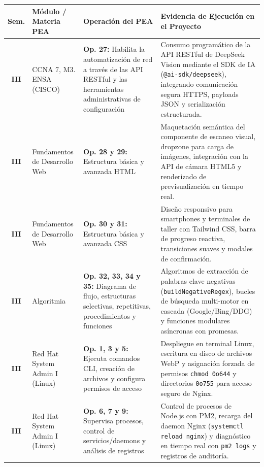\documentclass[11pt,a4paper]{article}
\begin{document}
\begin{table}[htbp]
\centering
\small
\begin{tabularx}{\textwidth}{c p{3.8cm} p{4.2cm} X}
\toprule
\rowcolor{tableheader}
\color{white}\textbf{Sem.} & \color{white}\textbf{Módulo / Materia PEA} & \color{white}\textbf{Operación del PEA} & \color{white}\textbf{Evidencia de Ejecución en el Proyecto} \\
\midrule
\rowcolor{lightrow}
\textbf{III} & CCNA 7, M3. ENSA (CISCO) & \textbf{Op. 27:} Habilita la automatización de red a través de las API RESTful y las herramientas administrativas de configuración & Consumo programático de la API RESTful de DeepSeek Vision mediante el SDK de IA (\texttt{@ai-sdk/deepseek}), integrando comunicación segura HTTPS, payloads JSON y serialización estructurada. \\
\midrule
\textbf{III} & Fundamentos de Desarrollo Web & \textbf{Op. 28 y 29:} Estructura básica y avanzada HTML & Maquetación semántica del componente de escaneo visual, dropzone para carga de imágenes, integración con la API de cámara HTML5 y renderizado de previsualización en tiempo real. \\
\midrule
\rowcolor{lightrow}
\textbf{III} & Fundamentos de Desarrollo Web & \textbf{Op. 30 y 31:} Estructura básica y avanzada CSS & Diseño responsivo para smartphones y terminales de taller con Tailwind CSS, barra de progreso reactiva, transiciones suaves y modales de confirmación. \\
\midrule
\textbf{III} & Algoritmia & \textbf{Op. 32, 33, 34 y 35:} Diagrama de flujo, estructuras selectivas, repetitivas, procedimientos y funciones & Algoritmos de extracción de palabras clave negativas (\texttt{buildNegativeRegex}), bucles de búsqueda multi-motor en cascada (Google/Bing/DDG) y funciones modulares asíncronas con promesas. \\
\midrule
\rowcolor{lightrow}
\textbf{III} & Red Hat System Admin I (Linux) & \textbf{Op. 1, 3 y 5:} Ejecuta comandos CLI, creación de archivos y configura permisos de acceso & Despliegue en terminal Linux, escritura en disco de archivos WebP y asignación forzada de permisos \texttt{chmod 0o644} y directorios \texttt{0o755} para acceso seguro de Nginx. \\
\midrule
\textbf{III} & Red Hat System Admin I (Linux) & \textbf{Op. 6, 7 y 9:} Supervisa procesos, control de servicios/daemons y análisis de registros & Control de procesos de Node.js con PM2, recarga del daemon Nginx (\texttt{systemctl reload nginx}) y diagnóstico en tiempo real con \texttt{pm2 logs} y registros de auditoría. \\

\end{tabularx}
\end{table}
\end{document}
